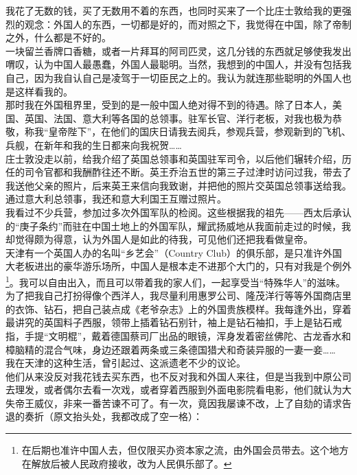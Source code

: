 我花了无数的钱，买了无数用不着的东西，也同时买来了一个比庄士敦给我的更强烈的观念：外国人的东西，一切都是好的，而对照之下，我觉得在中国，除了帝制之外，什么都是不好的。\\

一块留兰香牌口香糖，或者一片拜耳的阿司匹灵，这几分钱的东西就足够使我发出喟叹，认为中国人最愚蠢，外国人最聪明。当然，我想到的中国人，并没有包括我自己，因为我自认自己是凌驾于一切臣民之上的。我认为就连那些聪明的外国人也是这样看我的。\\

那时我在外国租界里，受到的是一般中国人绝对得不到的待遇。除了日本人，美国、英国、法国、意大利等各国的总领事。驻军长官、洋行老板，对我也极为恭敬，称我“皇帝陛下”，在他们的国庆日请我去阅兵，参观兵营，参观新到的飞机、兵舰，在新年和我的生日都来向我祝贺……\\

庄士敦没走以前，给我介绍了英国总领事和英国驻军司令，以后他们辗转介绍，历任的司令官都和我酬酢往还不断。英王乔治五世的第三子过津时访问过我，带去了我送他父亲的照片，后来英王来信向我致谢，并把他的照片交英国总领事送给我。通过意大利总领事，我还和意大利国王互赠过照片。\\

我看过不少兵营，参加过多次外国军队的检阅。这些根据我的祖先——西太后承认的“庚子条约”而驻在中国土地上的外国军队，耀武扬威地从我面前走过的时候，我却觉得颇为得意，认为外国人是如此的待我，可见他们还把我看做皇帝。\\

天津有一个英国人办的名叫“乡艺会”（Country Club）的俱乐部，是只准许外国大老板进出的豪华游乐场所，中国人是根本走不进那个大门的，只有对我是个例外\footnote{在后期也准许中国人去，但仅限买办资本家之流，由外国会员带去。这个地方在解放后被人民政府接收，改为人民俱乐部了。}。我可以自由出入，而且可以带着我的家人们，一起享受当“特殊华人”的滋味。\\

为了把我自己打扮得像个西洋人，我尽量利用惠罗公司、隆茂洋行等等外国商店里的衣饰、钻石，把自己装点成《老爷杂志》上的外国贵族模样。我每逢外出，穿着最讲究的英国料子西服，领带上插着钻石别针，袖上是钻石袖扣，手上是钻石戒指，手提“文明棍”，戴着德国蔡司厂出品的眼镜，浑身发着密丝佛陀、古龙香水和樟脑精的混合气味，身边还跟着两条或三条德国猎犬和奇装异服的一妻一妾……\\

我在天津的这种生活，曾引起过、这派遗老不少的议论。\\

他们从来没反对我花钱去买东西，也不反对我和外国人来往，但是当我到中原公司去理发，或者偶尔去看一次戏，或者穿着西服到外面电影院看电影，他们就认为大失帝王威仪，非来一番苦谏不可了。有一次，竟因我屡谏不改，上了自劾的请求告退的奏折（原文抬头处，我都改成了空一格）：\\

